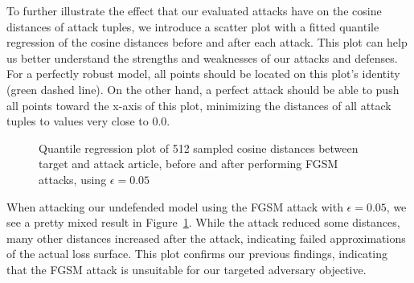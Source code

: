 To further illustrate the effect that our evaluated attacks have on the cosine distances of attack tuples, we introduce a scatter plot with a fitted quantile regression of the cosine distances before and after each attack. This plot can help us better understand the strengths and weaknesses of our attacks and defenses. For a perfectly robust model, all points should be located on this plot's identity (green dashed line). On the other hand, a perfect attack should be able to push all points toward the x-axis of this plot, minimizing the distances of all attack tuples to values very close to 0.0. 
\begin{figure}[H]
	\centering
	
	\caption{Quantile regression plot of 512 sampled cosine distances between target and attack article, before and after performing \acs{FGSM} attacks, using $\epsilon=0.05$}
	\label{fig:fgsm-quantile}
\end{figure}
When attacking our undefended model using the \ac{FGSM} attack with $\epsilon=0.05$, we see a pretty mixed result in Figure~\ref{fig:fgsm-quantile}. While the attack reduced some distances, many other distances increased after the attack, indicating failed approximations of the actual loss surface. This plot confirms our previous findings, indicating that the \ac{FGSM} attack is unsuitable for our targeted adversary objective.

